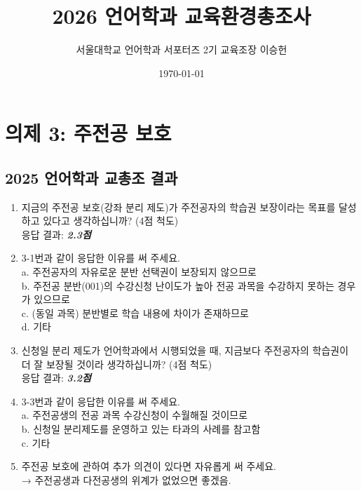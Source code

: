 \documentclass{oblivoir}
\title{\textbf{2026 언어학과 교육환경총조사}}
\author{서울대학교 언어학과 서포터즈 2기 교육조장 이승헌}
\date{\today}
\begin{document}
\maketitle

\section{의제 3: 주전공 보호}
\subsection{2025 언어학과 교총조 결과}
\begin{enumerate}
    \item [3-1] 지금의 주전공 보호(강좌 분리 제도)가 주전공자의 학습권 보장이라는 목표를 달성하고 있다고 생각하십니까? (4점 척도) \\ 응답 결과: \textbf{\textit{2.3점}}
    \item [3-2] 3-1번과 같이 응답한 이유를 써 주세요. \\ a. 주전공자의 자유로운 분반 선택권이 보장되지 않으므로 \\ b. 주전공 분반(001)의 수강신청 난이도가 높아 전공 과목을 수강하지 못하는 경우가 있으므로 \\ c. (동일 과목) 분반별로 학습 내용에 차이가 존재하므로 \\ d. 기타
    \item [3-3] 신청일 분리 제도가 언어학과에서 시행되었을 때, 지금보다 주전공자의 학습권이 더 잘 보장될 것이라 생각하십니까? (4점 척도) \\ 응답 결과: \textbf{\textit{3.2점}} 
    \item [3-4] 3-3번과 같이 응답한 이유를 써 주세요. \\ a. 주전공생의 전공 과목 수강신청이 수월해질 것이므로 \\ b. 신청일 분리제도를 운영하고 있는 타과의 사례를 참고함 \\ c. 기타
    \item [3-5] 주전공 보호에 관하여 추가 의견이 있다면 자유롭게 써 주세요. \\ → 주전공생과 다전공생의 위계가 없었으면 좋겠음. 
\end{enumerate}
\end{document}
